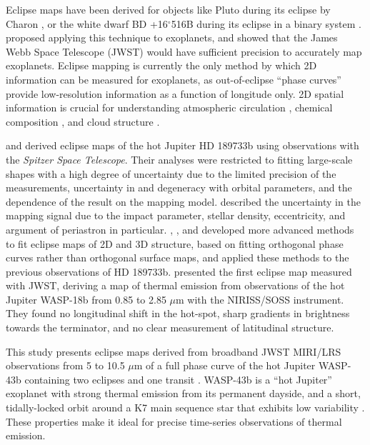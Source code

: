 \documentclass[twocolumn]{aastex631}
\begin{document}
Eclipse maps have been derived for objects like Pluto during its eclipse by Charon \citep{stern1992pluto}, or the white dwarf BD +16$^{\circ}$516B during its eclipse in a binary system \citep{warner1971measurement}. \citet{williams2006resolving} proposed applying this technique to exoplanets, and \citet{rauscher2007toward} showed that the James Webb Space Telescope (JWST) would have sufficient precision to accurately map exoplanets. Eclipse mapping is currently the only method by which 2D information can be measured for exoplanets, as out-of-eclipse ``phase curves'' provide low-resolution information as a function of longitude only. 2D spatial information is crucial for understanding atmospheric circulation \citep{lewis2022temperature}, chemical composition \citep{taylor2020understanding,yang2023testing}, and cloud structure \citep{parmentier2016transitions}.

\citet{de2012towards} and \citet{majeau2012two} derived eclipse maps of the hot Jupiter HD 189733b using observations with the \textit{Spitzer Space Telescope}. Their analyses were restricted to fitting large-scale shapes with a high degree of uncertainty due to the limited precision of the measurements, uncertainty in and degeneracy with orbital parameters, and the dependence of the result on the mapping model. \citet{de2012towards} described the uncertainty in the mapping signal due to the impact parameter, stellar density, eccentricity, and argument of periastron in particular. \citet{rauscher2018eigenmap}, \citet{mansfield2020eigenspectra}, and \citet{challener2022theresa} developed more advanced methods to fit eclipse maps of 2D and 3D structure, based on fitting orthogonal phase curves rather than orthogonal surface maps, and applied these methods to the previous observations of HD 189733b. \citet{coulombe2023wasp18b} presented the first eclipse map measured with JWST, deriving a map of thermal emission from observations of the hot Jupiter WASP-18b from 0.85 to 2.85 $\mu$m with the NIRISS/SOSS instrument. They found no longitudinal shift in the hot-spot, sharp gradients in brightness towards the terminator, and no clear measurement of latitudinal structure.

This study presents eclipse maps derived from broadband JWST MIRI/LRS \citep{kendrew2015mid} observations from 5 to 10.5 $\mu$m of a full phase curve of the hot Jupiter WASP-43b containing two eclipses and one transit \citep{bell2023wasp43b}. WASP-43b is a ``hot Jupiter'' exoplanet with strong thermal emission from its permanent dayside, and a short, tidally-locked orbit around a K7 main sequence star that exhibits low variability \citep{hellier2011wasp,scandariato2022phase}. These properties make it ideal for precise time-series observations of thermal emission. 
\end{document}
